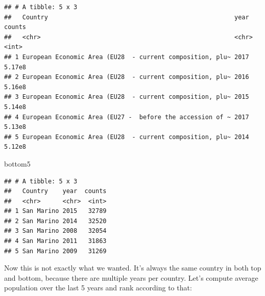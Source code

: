\documentclass[]{book}
\newenvironment{Shaded}{\begin{snugshade}}{\end{snugshade}}
\newcommand{\KeywordTok}[1]{\textcolor[rgb]{0.13,0.29,0.53}{\textbf{#1}}}
\newcommand{\DataTypeTok}[1]{\textcolor[rgb]{0.13,0.29,0.53}{#1}}
\newcommand{\DecValTok}[1]{\textcolor[rgb]{0.00,0.00,0.81}{#1}}
\newcommand{\StringTok}[1]{\textcolor[rgb]{0.31,0.60,0.02}{#1}}
\newcommand{\OperatorTok}[1]{\textcolor[rgb]{0.81,0.36,0.00}{\textbf{#1}}}
\newcommand{\NormalTok}[1]{#1}
\theoremstyle{definition}
\theoremstyle{definition}
\theoremstyle{definition}
\theoremstyle{remark}
\begin{document}
\begin{verbatim}
## # A tibble: 5 x 3
##   Country                                                   year    counts
##   <chr>                                                     <chr>    <int>
## 1 European Economic Area (EU28  - current composition, plu~ 2017    5.17e8
## 2 European Economic Area (EU28  - current composition, plu~ 2016    5.16e8
## 3 European Economic Area (EU28  - current composition, plu~ 2015    5.14e8
## 4 European Economic Area (EU27 -  before the accession of ~ 2017    5.13e8
## 5 European Economic Area (EU28  - current composition, plu~ 2014    5.12e8
\end{verbatim}

\begin{Shaded}
\begin{Highlighting}[]
\NormalTok{bottom5}
\end{Highlighting}
\end{Shaded}

\begin{verbatim}
## # A tibble: 5 x 3
##   Country    year  counts
##   <chr>      <chr>  <int>
## 1 San Marino 2015   32789
## 2 San Marino 2014   32520
## 3 San Marino 2008   32054
## 4 San Marino 2011   31863
## 5 San Marino 2009   31269
\end{verbatim}

Now this is not exactly what we wanted. It's always the same country in
both top and bottom, because there are multiple years per country. Let's
compute average population over the last 5 years and rank according to
that:

\begin{Shaded}
\end{Shaded}
\end{document}
